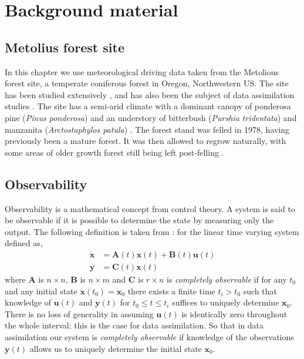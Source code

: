 \documentclass[11pt]{article}
\begin{document}
\section{Background material}

\subsection{Metolius forest site} \label{sec:oregon}
In this chapter we use meteorological driving data taken from the Metolious forest site, a temperate coniferous forest in Oregon, Northwestern US. The site has been studied extensively \citep{law2001carbon}, and has also been the subject of data assimilation studies \citep{williams2005improved, Quaife2008}. The site has a semi-arid climate with a dominant canopy of ponderosa pine (\textit{Pinus ponderosa}) and an understory of bitterbush (\textit{Purshia tridentata}) and manzanita (\textit{Arctostaphylos patula}) \citep{law2001estimation}. The forest stand was felled in 1978, having previously been a mature forest. It was then allowed to regrow naturally, with some areas of older growth forest still being left post-felling \citep{williams2005improved}.

\subsection{Observability}

Observability is a mathematical concept from control theory. A system is said to be observable if it is possible to determine the state by measuring only the output. The following definition is taken from \citet{barnett1985introduction}: for the linear time varying system defined as,
\begin{align}
\dot{\textbf{x}} &= \textbf{A}(t)\textbf{x}(t) +\textbf{B}(t)\textbf{u}(t) \\
\textbf{y} &= \textbf{C}(t)\textbf{x}(t)
\end{align}
where $\textbf{A}$ is $n \times n$, $\textbf{B}$ is $n \times m$ and $\textbf{C}$ is $r \times n$ is \textit{completely observable} if for any $t_0$ and any initial state $\textbf{x}(t_0) = \textbf{x}_0$ there exists a finite time $t_i > t_0$ such that knowledge of $\textbf{u}(t)$ and $\textbf{y}(t)$ for $t_0 \leq t \leq t_i$ suffices to uniquely determine $\textbf{x}_0$. There is no loss of generality in assuming $\textbf{u}(t)$ is identically zero throughout the whole interval; this is the case for data assimilation. So that in data assimilation our system is \textit{completely observable} if knowledge of the observations $\textbf{y}(t)$ allows us to uniquely determine the initial state $\textbf{x}_0$.
\end{document}
